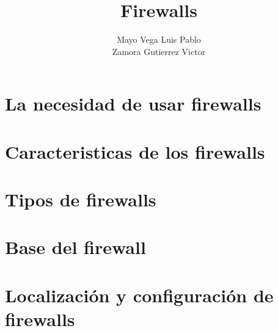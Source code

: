 \documentclass{beamer}
\title{Firewalls}
\author{Mayo Vega Luis Pablo \\ Zamora Gutierrez Victor}
\institute{Criptografía y Seguridad 2017-2 \\ (Facultad de Ciencias)}
\date{\nodate}
\begin{document}
\frame{
  \maketitle
}
\section{La necesidad de usar firewalls}
\section{Caracteristicas de los firewalls}
\section{Tipos de firewalls}
\section{Base del firewall}
\section{Localización y configuración de firewalls}
\end{document}
